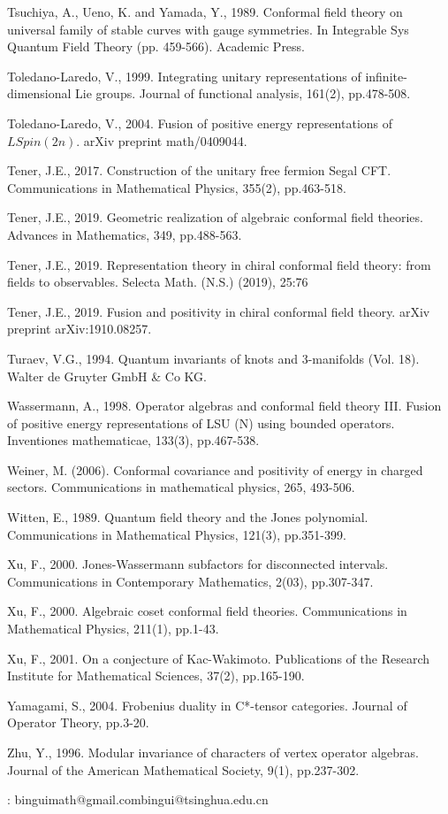 \documentclass[12pt,a4paper]{article}
\theoremstyle{definition}
\theoremstyle{plain}
\numberwithin{equation}{subsection}
\begin{document}
\begin{thebibliography}{999999}
Tsuchiya, A., Ueno, K. and Yamada, Y., 1989. Conformal field theory on universal family of stable curves with gauge symmetries. In Integrable Sys Quantum Field Theory (pp. 459-566). Academic Press.

Toledano-Laredo, V., 1999. Integrating unitary representations of infinite-dimensional Lie groups. Journal of functional analysis, 161(2), pp.478-508.

Toledano-Laredo, V., 2004. Fusion of positive energy representations of $LSpin(2n)$. arXiv preprint math/0409044.

Tener, J.E., 2017. Construction of the unitary free fermion Segal CFT. Communications in Mathematical Physics, 355(2), pp.463-518.



Tener, J.E., 2019. Geometric realization of algebraic conformal field theories. Advances in Mathematics, 349, pp.488-563.


Tener, J.E., 2019. Representation theory in chiral conformal field theory: from fields to
observables. Selecta Math. (N.S.) (2019), 25:76

Tener, J.E., 2019. Fusion and positivity in chiral conformal field theory. arXiv preprint arXiv:1910.08257.



Turaev, V.G., 1994. Quantum invariants of knots and 3-manifolds (Vol. 18). Walter de Gruyter GmbH \& Co KG.

Wassermann, A., 1998. Operator algebras and conformal field theory III. Fusion of positive energy representations of LSU (N) using bounded operators. Inventiones mathematicae, 133(3), pp.467-538.

Weiner, M. (2006). Conformal covariance and positivity of energy in charged sectors. Communications in mathematical physics, 265, 493-506.

Witten, E., 1989. Quantum field theory and the Jones polynomial. Communications in Mathematical Physics, 121(3), pp.351-399.

Xu, F., 2000. Jones-Wassermann subfactors for disconnected intervals. Communications in Contemporary Mathematics, 2(03), pp.307-347.

Xu, F., 2000. Algebraic coset conformal field theories. Communications in Mathematical Physics, 211(1), pp.1-43.

Xu, F., 2001. On a conjecture of Kac-Wakimoto. Publications of the Research Institute for Mathematical Sciences, 37(2), pp.165-190.

Yamagami, S., 2004. Frobenius duality in C*-tensor categories. Journal of Operator Theory, pp.3-20.

Zhu, Y., 1996. Modular invariance of characters of vertex operator algebras. Journal of the American Mathematical Society, 9(1), pp.237-302.


	
\end{thebibliography}

: binguimath@gmail.com\qquad bingui@tsinghua.edu.cn
\end{document}
